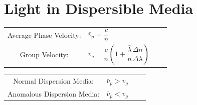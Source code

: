 \section{Light in Dispersible Media}

\begin{table}[h]
  \centering
  \begin{tabular}{Sl Sl}
    Average Phase Velocity: & $\bar{v}_p = \dfrac{c}{\bar{n}} $ \\
    Group Velocity: & $v_g = \dfrac{c}{\bar{n}} \left( 1 + \dfrac{\bar{\lambda}}{\bar{n}} \dfrac{\Delta n}{\Delta \lambda}   \right) $ \\
  \end{tabular}
  \quad\quad\quad\quad
  \begin{tabular}{Sl Sl}
    Normal Dispersion Media: & $\bar{v}_p > v_g $ \\
    Anomalous Dispersion Media: & $ \bar{v}_p < v_g $ \\
  \end{tabular}
\end{table}


